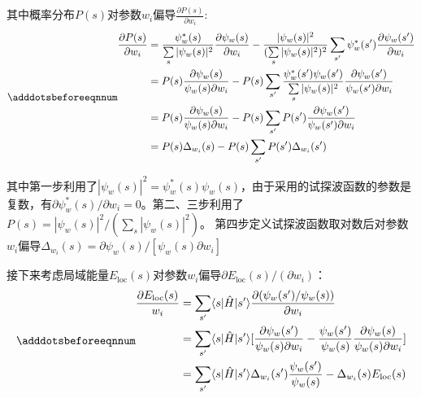 其中概率分布$P(s)$对参数$w_i$偏导$\frac{\partial P(s)}{\partial w_i}$:
\begin{equation} \label{eq:P(s)_partial}
    \adddotsbeforeeqnnum%
    \begin{split}
        \frac{\partial P(s)}{\partial w_i}&=\frac{\psi_{w}^{*}(s)}{\sum\limits_{s}|\psi_{w}(s)|^{2}}\frac{\partial \psi_{w}(s)}{\partial w_{i}}-
        \frac{|\psi_{w}(s)|^{2}}{(\sum\limits_{s}|\psi_{w}(s)|^{2})^2}\sum_{s^{\prime}}\psi_{w}^{*}(s^{\prime})\frac{\partial \psi_{w}(s^{\prime})}{\partial w_i}
        \\
        &=P(s)\frac{\partial \psi_{w}(s)}{\psi_{w}(s)\partial w_{i}}-P(s)\sum_{s^{\prime}}\frac{\psi_{w}^{*}(s^{\prime})\psi_{w}(s^{\prime})}{\sum\limits_{s}|\psi_{w}(s)|^{2}}\frac{\partial \psi_{w}(s^{\prime})}{\psi_{w}(s^{\prime})\partial w_{i}}
        \\
        &=P(s)\frac{\partial \psi_{w}(s)}{\psi_{w}(s)\partial w_{i}}-P(s)\sum_{s^{\prime}}P(s^{\prime})\frac{\partial \psi_{w}(s^{\prime})}{\psi_{w}(s^{\prime})\partial w_{i}}
        \\
        &=P(s)\Delta_{w_i}(s)-P(s)\sum_{s^{\prime}}P(s^{\prime})\Delta_{w_i}(s^{\prime})
    \end{split}
\end{equation}

其中第一步利用了$|\psi_{w}(s)|^{2}=\psi_{w}^{*}(s)\psi_{w}(s)$，由于采用的试探波函数的参数是复数，有$\partial \psi_{w}^{*}(s)/\partial w_{i} = 0$。第二、三步利用了$P(s)=|\psi_{w}(s)|^{2} /(\sum\limits_{s}|\psi_{w}(s)|^{2})$。
第四步定义试探波函数取对数后对参数$w_i$偏导$\Delta_{w_i}(s)=\partial \psi_{w}(s)/[\psi_{w}(s)\partial w_{i}]$

接下来考虑局域能量$E_{\text{loc}}(s)$对参数$w_i$偏导$\partial E_{\text{loc}}(s)/(\partial w_i)$：
\begin{equation} \label{eq:E_loc_partial}
    \adddotsbeforeeqnnum%
    \begin{split}
        \frac{\partial E_{\text{loc}}(s)}{w_i} &= \sum_{s^{\prime}}\langle s|\hat{H}|s^{\prime}\rangle\frac{\partial (\psi_{w}(s^{\prime})/\psi_{w}(s))}{\partial w_i}
        \\
        &= \sum_{s^{\prime}}\langle s|\hat{H}|s^{\prime}\rangle [\frac{\partial \psi_{w}(s^{\prime})}{\psi_{w}(s) \partial w_{i}} - \frac{\psi_{w}(s^{\prime})}{\psi_{w}(s)}\frac{\partial \psi_{w}(s)}{\psi_{w}(s)\partial w_i}]
        \\
        &= \sum_{s^{\prime}}\langle s|\hat{H}|s^{\prime}\rangle \Delta_{w_i}(s^{\prime})\frac{\psi_{w}(s^{\prime})}{\psi_{w}(s)} - \Delta_{w_i}(s)E_{\text{loc}}(s)
    \end{split}
\end{equation}

